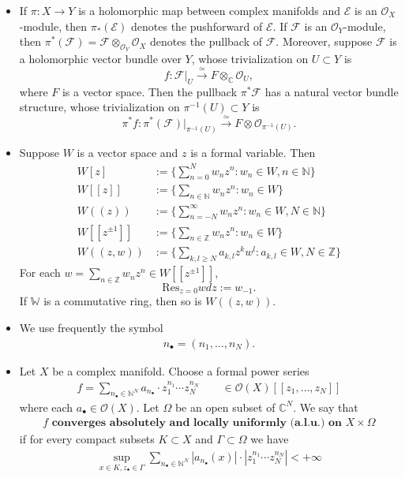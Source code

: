 \documentclass[11pt,b5paper,notitlepage]{article}
\theoremstyle{definition}
\theoremstyle{plain}
\newcommand{\Res}{\mathrm{Res}}
\newcommand{\scr}{\mathscr}
\newcommand{\blt}{\bullet}
\newcommand{\Wbb}{\mathbb W}
\newcommand{\Cbb}{\mathbb C}
\newcommand{\Nbb}{\mathbb N}
\newcommand{\Zbb}{\mathbb Z}
\newcommand{\<}{\left\langle}
\renewcommand{\>}{\right\rangle}
\newcommand{\MO}{\mathcal{O}}
\newcommand{\ME}{\mathcal{E}}
\newcommand{\MF}{\mathcal{F}}
\numberwithin{equation}{section}
\begin{document}
\begin{subappendices}
\begin{itemize}
    \item If $\pi:X\rightarrow Y$ is a holomorphic map between complex manifolds and $\ME$ is an $\MO_X$-module, then $\pi_*(\ME)$ denotes the pushforward of $\ME$. If $\MF$ is an $\MO_Y$-module, then $\pi^*(\MF)=\MF\otimes_{\MO_Y}\MO_X$ denotes the pullback of $\MF$. Moreover, suppose $\MF$ is a holomorphic vector bundle over $Y$, whose trivialization on $U\subset Y$ is 
    $$
    f:\MF\vert_U\xrightarrow{\simeq} F\otimes_\Cbb \MO_U,
    $$
    where $F$ is a vector space. Then the pullback $\pi^*\MF$ has a natural vector bundle structure, whose trivialization on $\pi^{-1}(U)\subset Y$ is 
    $$
    \pi^*f:\pi^*(\MF)\vert_{\pi^{-1}(U)}\xrightarrow{\simeq} F\otimes \MO_{\pi^{-1}(U)}.
    $$
    \item Suppose $W$ is a vector space and $z$ is a formal variable. Then 
    $$
    \begin{aligned}
    W[z]&:=\{\sum_{n=0}^N w_n z^n:w_n\in W,n\in \Nbb\}\\
    W[[z]]&:=\{\sum_{n\in \Nbb}w_nz^n:w_n\in W\}\\
    W((z))&:=\{\sum_{n=-N}^{\infty}w_nz^n:w_n\in W,N\in \Nbb\}\\
    W[[z^{\pm 1}]]&:=\{\sum_{n\in \Zbb}w_nz^n:w_n\in W\}\\
    W((z,w))&:=\{\sum_{k,l\geq N}a_{k,l}z^k w^l:a_{k,l}\in W,N\in \Zbb\}
    \end{aligned}
    $$
    For each $w=\sum_{n\in \Zbb}w_nz^n\in W[[z^{\pm 1}]]$, 
    $$
    \Res_{z=0}wdz:=w_{-1}.
    $$
    If $\Wbb$ is a commutative ring, then so is $W((z,w))$.
\item We use frequently the symbol \index{n@$n_\blt=(n_1,\dots,n_N).$}
\begin{align}\label{eq33}
n_\blt=(n_1,\dots,n_N).
\end{align}
\item Let $X$ be a complex manifold. Choose a formal power series 
\begin{align*}
f=\sum_{n_\blt\in\Nbb^N}a_{n_\blt}\cdot z_1^{n_1}\cdots z_N^{n_N}\qquad\in\scr O(X)[[z_1,\dots,z_N]]
\end{align*}
where each $a_{\blt}\in\scr O(X)$. Let $\Omega$ be an open subset of $\Cbb^N$. We say that 
\begin{align}\label{eq34}
f\textbf{ converges absolutely and locally uniformly (a.l.u.) on } X\times\Omega
\end{align}
if for every compact subsets $K\subset X$ and $\Gamma\subset \Omega$ we have
\begin{align*}
\sup_{x\in K,z_\blt\in\Gamma}\sum_{n_\blt\in\Nbb^N} |a_{n_\blt}(x)|\cdot |z_1^{n_1}\cdots z_N^{n_N}|<+\infty
\end{align*}
\end{itemize}

\end{subappendices}
\end{document}
